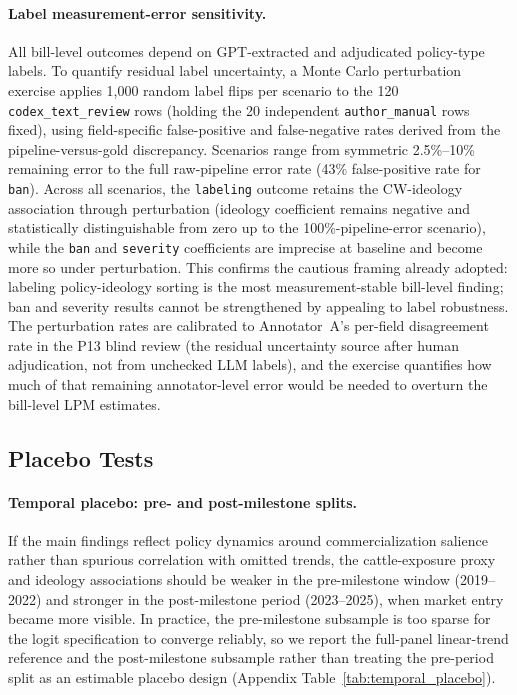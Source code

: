 \documentclass[12pt]{article}
\begin{document}
\paragraph{Label measurement-error sensitivity.}  All bill-level outcomes depend on GPT-extracted and adjudicated policy-type labels.  To quantify residual label uncertainty, a Monte Carlo perturbation exercise applies 1,000 random label flips per scenario to the 120 \texttt{codex\_text\_review} rows (holding the 20 independent \texttt{author\_manual} rows fixed), using field-specific false-positive and false-negative rates derived from the pipeline-versus-gold discrepancy.  Scenarios range from symmetric 2.5\%--10\% remaining error to the full raw-pipeline error rate (43\% false-positive rate for \texttt{ban}).  Across all scenarios, the \texttt{labeling} outcome retains the CW-ideology association through perturbation (ideology coefficient remains negative and statistically distinguishable from zero up to the 100\%-pipeline-error scenario), while the \texttt{ban} and \texttt{severity} coefficients are imprecise at baseline and become more so under perturbation.  This confirms the cautious framing already adopted: labeling policy-ideology sorting is the most measurement-stable bill-level finding; ban and severity results cannot be strengthened by appealing to label robustness.  The perturbation rates are calibrated to Annotator~A's per-field disagreement rate in the P13 blind review (the residual uncertainty source after human adjudication, not from unchecked LLM labels), and the exercise quantifies how much of that remaining annotator-level error would be needed to overturn the bill-level LPM estimates.


\subsection{Placebo Tests}
\label{sec:placebo}

\paragraph{Temporal placebo: pre- and post-milestone splits.}  If the main findings reflect policy dynamics around commercialization salience rather than spurious correlation with omitted trends, the cattle-exposure proxy and ideology associations should be weaker in the pre-milestone window (2019--2022) and stronger in the post-milestone period (2023--2025), when market entry became more visible.  In practice, the pre-milestone subsample is too sparse for the logit specification to converge reliably, so we report the full-panel linear-trend reference and the post-milestone subsample rather than treating the pre-period split as an estimable placebo design (Appendix Table~\ref{tab:temporal_placebo}).
\end{document}
